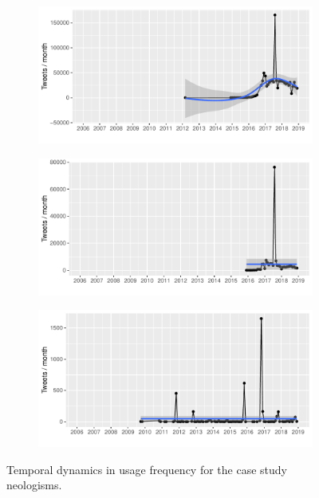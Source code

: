 \documentclass[
  a4paper,
  abstract=on,
  captions=tableabove
  ]{scrartcl}
\begin{document}
\begin{figure}
        \begin{subfigure}{.3\linewidth}
          \caption{}
          \label{subfig:freq_temp_alt-right}
          \includegraphics[width=\linewidth, height=.8\textheight, keepaspectratio]{"img/ui_alt-right_gam.pdf"}
        \end{subfigure}
        \begin{subfigure}{.3\linewidth}
          \caption{}
          \includegraphics[width=\linewidth, height=.8\textheight, keepaspectratio]{"img/ui_alt-left_gam.pdf"}
        \end{subfigure}
        \begin{subfigure}{.3\linewidth}
          \caption{}
          \includegraphics[width=\linewidth, height=.8\textheight, keepaspectratio]{"img/ui_poppygate_gam.pdf"}
        \end{subfigure}
        \caption{Temporal dynamics in usage frequency for the case study neologisms.}
        \label{fig:freq-abs}
      \end{figure}
\end{document}
